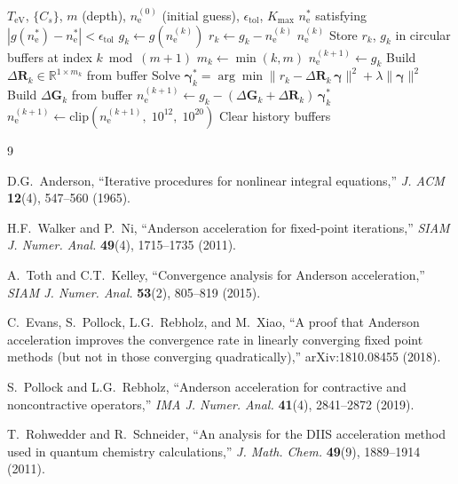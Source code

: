 \documentclass[11pt]{article}
\newcommand{\ne}{n_\mathrm{e}}
\newcommand{\TeV}{T_\mathrm{eV}}
\newcommand{\bgamma}{\boldsymbol{\gamma}}
\newcommand{\DR}{\Delta\mathbf{R}}
\newcommand{\DG}{\Delta\mathbf{G}}
\begin{document}
\begin{algorithm}[H]
\caption{Anderson-Accelerated Saha-Boltzmann Solver (AA-SB)}
\label{alg:aa-sb}
\begin{algorithmic}[1]
\REQUIRE $\TeV$, $\{C_s\}$, $m$ (depth), $\ne^{(0)}$ (initial guess),
         $\epsilon_\mathrm{tol}$, $K_\mathrm{max}$
\ENSURE $\ne^*$ satisfying $|g(\ne^*) - \ne^*| < \epsilon_\mathrm{tol}$
  \STATE $g_k \leftarrow g(\ne^{(k)})$ \hfill{}
  \STATE $r_k \leftarrow g_k - \ne^{(k)}$
    \RETURN $\ne^{(k)}$
  \ENDIF
  \STATE Store $r_k$, $g_k$ in circular buffers at index $k \bmod (m+1)$
  \STATE $m_k \leftarrow \min(k, m)$
    \STATE $\ne^{(k+1)} \leftarrow g_k$ \hfill{}
  \ELSE
    \STATE Build $\DR_k \in \mathbb{R}^{1 \times m_k}$ from buffer
    \STATE Solve $\bgamma_k^* = \arg\min \|r_k - \DR_k\,\bgamma\|^2 + \lambda\|\bgamma\|^2$ \hfill{}
    \STATE Build $\DG_k$ from buffer
    \STATE $\ne^{(k+1)} \leftarrow g_k - (\DG_k + \DR_k)\,\bgamma_k^*$
  \ENDIF
  \STATE $\ne^{(k+1)} \leftarrow \mathrm{clip}(\ne^{(k+1)},\; 10^{12},\; 10^{20})$
    \STATE Clear history buffers \hfill{}
  \ENDIF
\ENDFOR
\end{algorithmic}
\end{algorithm}


\begin{thebibliography}{9}

D.G.~Anderson,
``Iterative procedures for nonlinear integral equations,''
\emph{J. ACM} \textbf{12}(4), 547--560 (1965).

H.F.~Walker and P.~Ni,
``Anderson acceleration for fixed-point iterations,''
\emph{SIAM J. Numer. Anal.} \textbf{49}(4), 1715--1735 (2011).

A.~Toth and C.T.~Kelley,
``Convergence analysis for Anderson acceleration,''
\emph{SIAM J. Numer. Anal.} \textbf{53}(2), 805--819 (2015).

C.~Evans, S.~Pollock, L.G.~Rebholz, and M.~Xiao,
``A proof that Anderson acceleration improves the convergence rate in
linearly converging fixed point methods (but not in those converging
quadratically),''
arXiv:1810.08455 (2018).

S.~Pollock and L.G.~Rebholz,
``Anderson acceleration for contractive and noncontractive operators,''
\emph{IMA J. Numer. Anal.} \textbf{41}(4), 2841--2872 (2019).

T.~Rohwedder and R.~Schneider,
``An analysis for the DIIS acceleration method used in quantum chemistry
calculations,''
\emph{J. Math. Chem.} \textbf{49}(9), 1889--1914 (2011).

\end{thebibliography}
\end{document}

